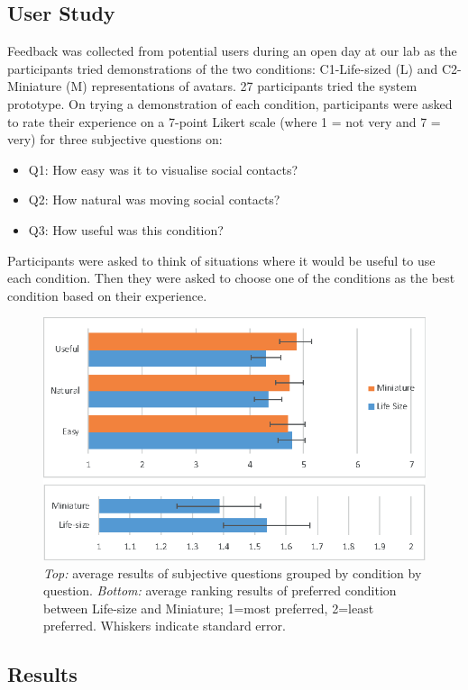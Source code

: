 \subsection{User Study}

Feedback was collected from potential users during an open day at our lab as the participants tried demonstrations of the two conditions: C1-Life-sized (L) and C2-Miniature (M) representations of avatars. 27 participants tried the system prototype. On trying a demonstration of each condition, participants were asked to rate their experience on a 7-point Likert scale (where 1 = not very and 7 = very) for three subjective questions on: 

\begin{itemize}
    \item Q1: How easy was it to visualise social contacts?
    \item Q2: How natural was moving social contacts?
    \item Q3: How useful was this condition?
\end{itemize}

Participants were asked to think of situations where it would be useful to use each condition. Then they were asked to choose one of the conditions as the best condition based on their experience. 

\begin{figure}[h]
    \centering
    \includegraphics[width=0.8\linewidth]{images/ismar17/images-09.eps}
    \caption{\textit{Top:} average results of subjective questions grouped by condition by question. \textit{Bottom:} average ranking results of preferred condition between Life-size and Miniature; 1=most preferred, 2=least preferred. Whiskers indicate standard error.}
    \label{fig:continuum:results}
\end{figure}

\subsection{Results}

